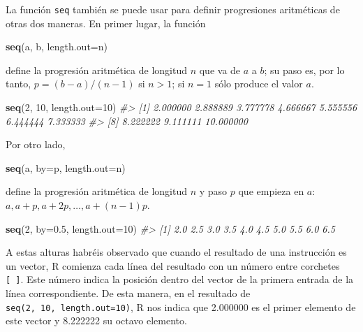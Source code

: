 \documentclass[
]{book}
\newenvironment{Shaded}{\begin{snugshade}}{\end{snugshade}}
\newcommand{\CommentTok}[1]{\textcolor[rgb]{0.56,0.35,0.01}{\textit{#1}}}
\newcommand{\DataTypeTok}[1]{\textcolor[rgb]{0.13,0.29,0.53}{#1}}
\newcommand{\DecValTok}[1]{\textcolor[rgb]{0.00,0.00,0.81}{#1}}
\newcommand{\FloatTok}[1]{\textcolor[rgb]{0.00,0.00,0.81}{#1}}
\newcommand{\KeywordTok}[1]{\textcolor[rgb]{0.13,0.29,0.53}{\textbf{#1}}}
\newcommand{\NormalTok}[1]{#1}
\theoremstyle{definition}
\theoremstyle{definition}
\theoremstyle{definition}
\theoremstyle{remark}
\begin{document}
La función \texttt{seq} también se puede usar para definir progresiones aritméticas de otras dos maneras. En primer lugar, la función

\begin{Shaded}
\begin{Highlighting}[]
\KeywordTok{seq}\NormalTok{(a, b, }\DataTypeTok{length.out=}\NormalTok{n)}
\end{Highlighting}
\end{Shaded}

define la progresión aritmética de longitud \(n\) que va de \(a\) a \(b\); su paso es, por lo tanto, \(p=(b-a)/(n-1)\) si \(n>1\); si \(n=1\) sólo produce el valor \(a\).

\begin{Shaded}
\begin{Highlighting}[]
\KeywordTok{seq}\NormalTok{(}\DecValTok{2}\NormalTok{, }\DecValTok{10}\NormalTok{, }\DataTypeTok{length.out=}\DecValTok{10}\NormalTok{)}
\CommentTok{\#\textgreater{}  [1]  2.000000  2.888889  3.777778  4.666667  5.555556  6.444444  7.333333}
\CommentTok{\#\textgreater{}  [8]  8.222222  9.111111 10.000000}
\end{Highlighting}
\end{Shaded}

Por otro lado,

\begin{Shaded}
\begin{Highlighting}[]
\KeywordTok{seq}\NormalTok{(a, }\DataTypeTok{by=}\NormalTok{p, }\DataTypeTok{length.out=}\NormalTok{n)}
\end{Highlighting}
\end{Shaded}

define la progresión aritmética de longitud \(n\) y paso \(p\) que empieza en \(a\):
\(a, a+p, a+2p, \ldots, a+(n-1)p\).

\begin{Shaded}
\begin{Highlighting}[]
\KeywordTok{seq}\NormalTok{(}\DecValTok{2}\NormalTok{, }\DataTypeTok{by=}\FloatTok{0.5}\NormalTok{, }\DataTypeTok{length.out=}\DecValTok{10}\NormalTok{)}
\CommentTok{\#\textgreater{}  [1] 2.0 2.5 3.0 3.5 4.0 4.5 5.0 5.5 6.0 6.5}
\end{Highlighting}
\end{Shaded}

A estas alturas habréis observado que cuando el resultado de una instrucción es un vector, R comienza cada línea del resultado con un número entre corchetes \texttt{{[}\ {]}}. Este número indica la posición dentro del vector de la primera entrada de la línea correspondiente. De esta manera, en el resultado de \texttt{seq(2,\ 10,\ length.out=10)}, R nos indica que 2.000000 es el primer elemento de este vector y 8.222222 su octavo elemento.
\end{document}

